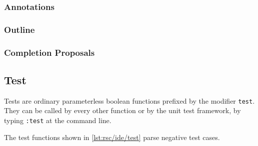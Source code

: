 \subsubsection{Annotations}



\subsubsection{Outline}



\subsubsection{Completion Proposals}



\subsection{Test}

Tests are ordinary parameterless boolean functions prefixed by the modifier \lstinline[language=rascal]{test}.
They can be called by every other function or by the unit test framework, by typing \texttt{:test} at the command line.

The test functions shown in \autoref{lst:rsc/ide/test} parse negative test cases.


